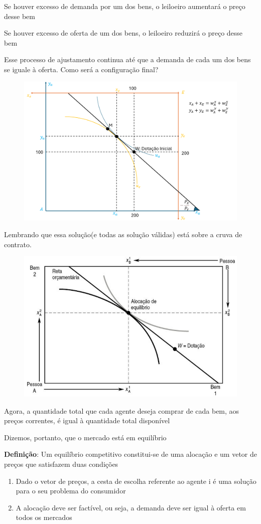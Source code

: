 \documentclass[a4paper,12pt]{article}[abntex2]
\begin{document}
Se houver excesso de demanda por um dos bens, o leiloeiro aumentará o preço desse bem

Se houver excesso de oferta de um dos bens, o leiloeiro reduzirá o preço desse bem

Esse processo de ajustamento continua até que a demanda de cada um dos bens se iguale à oferta. Como será a configuração final?

\begin{figure}[H]
    \centering
    \includegraphics[width=0.70\linewidth]{Imagens/a3i10.png}
\end{figure}

Lembrando que essa solução(e todas as solução válidas) está sobre a cruva de contrato.


\begin{figure}[H]
    \centering
    \includegraphics[width=0.70\linewidth]{Imagens/a2i7.png}
\end{figure}

Agora, a quantidade total que cada agente deseja comprar de cada bem, aos preços correntes, é igual à quantidade total disponível

Dizemos, portanto, que o mercado está em equilíbrio

\textbf{Definição}: Um equilíbrio competitivo constitui-se de uma alocação e um vetor de preços que satisfazem duas condições\begin{enumerate}
    \item Dado o vetor de preços, a cesta de escolha referente ao agente i  é uma solução para o seu problema do consumidor
    \item A alocação deve ser factível, ou seja, a demanda deve ser igual à oferta em todos os mercados
\end{enumerate}
\end{document}
